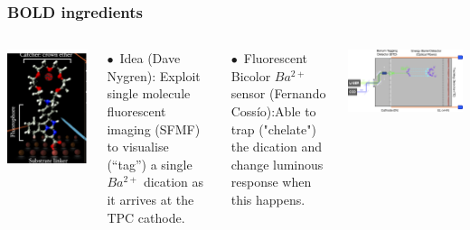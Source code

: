 \begin{frame}
\frametitle{BOLD ingredients}
\begin{columns}
\includegraphics[scale=0.15]{img/FBI.png}

$\bullet$~Idea (Dave Nygren): Exploit single molecule fluorescent imaging (SFMF) to visualise (“tag”) a  single  $Ba^{2+}$ dication as it arrives at the TPC cathode.

$\bullet$~Fluorescent Bicolor $Ba^{2+}$ sensor (Fernando Coss\'io):Able to trap ("chelate") the dication and change luminous response when this happens. 

\includegraphics[scale=0.12]{img/nextBold.png}


\end{columns}
\end{frame}
